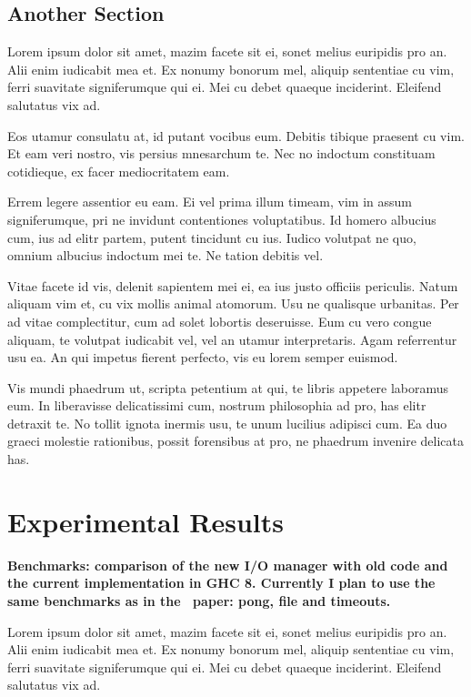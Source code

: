 \documentclass[a4paper,11pt,oneside]{report}
\begin{document}
\section{Another Section}

Lorem ipsum dolor sit amet, mazim facete sit ei, sonet melius euripidis pro
an. Alii enim iudicabit mea et. Ex nonumy bonorum mel, aliquip sententiae cu
vim, ferri suavitate signiferumque qui ei. Mei cu debet quaeque
inciderint. Eleifend salutatus vix ad.

Eos utamur consulatu at, id putant vocibus eum. Debitis tibique praesent cu
vim. Et eam veri nostro, vis persius mnesarchum te. Nec no indoctum constituam
cotidieque, ex facer mediocritatem eam.

Errem legere assentior eu eam. Ei vel prima illum timeam, vim in assum
signiferumque, pri ne invidunt contentiones voluptatibus. Id homero albucius
cum, ius ad elitr partem, putent tincidunt cu ius. Iudico volutpat ne quo,
omnium albucius indoctum mei te. Ne tation debitis vel.

Vitae facete id vis, delenit sapientem mei ei, ea ius justo officiis
periculis. Natum aliquam vim et, cu vix mollis animal atomorum. Usu ne qualisque
urbanitas. Per ad vitae complectitur, cum ad solet lobortis deseruisse. Eum cu
vero congue aliquam, te volutpat iudicabit vel, vel an utamur
interpretaris. Agam referrentur usu ea. An qui impetus fierent perfecto, vis eu
lorem semper euismod.

Vis mundi phaedrum ut, scripta petentium at qui, te libris appetere laboramus
eum. In liberavisse delicatissimi cum, nostrum philosophia ad pro, has elitr
detraxit te. No tollit ignota inermis usu, te unum lucilius adipisci cum. Ea duo
graeci molestie rationibus, possit forensibus at pro, ne phaedrum invenire
delicata has.

\chapter{Experimental Results}

\textbf{Benchmarks: comparison of the new I/O manager with old code and the
  current implementation in GHC 8. Currently I plan to use the same benchmarks
  as in the~\cite{bib:o'sullivan} paper: pong, file and timeouts.}

Lorem ipsum dolor sit amet, mazim facete sit ei, sonet melius euripidis pro
an. Alii enim iudicabit mea et. Ex nonumy bonorum mel, aliquip sententiae cu
vim, ferri suavitate signiferumque qui ei. Mei cu debet quaeque
inciderint. Eleifend salutatus vix ad.
\end{document}
